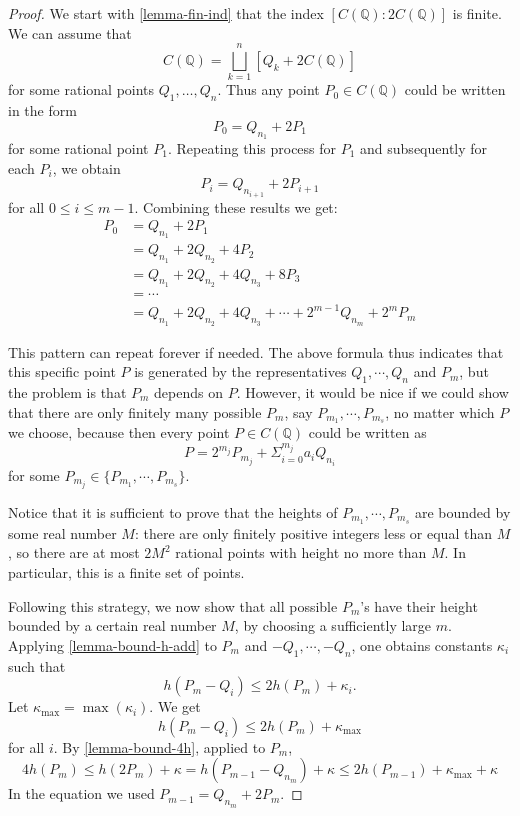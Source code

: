 \documentclass[12pt]{article}
\theoremstyle{remark}
\theoremstyle{definition}
\newcommand{\kp}[0]{\kappa}
\begin{document}
        \begin{proof}
            We start with \autoref{lemma-fin-ind} that the index $[C(\mathbb{Q}):2C(\mathbb{Q})]$ is finite. We can assume that $$C(\mathbb{Q})=\bigsqcup_{k=1}^n\left[Q_k+2C(\mathbb{Q})\right]$$
            for some rational points $Q_1,\dots,Q_n$. Thus any point $P_0\in C(\mathbb{Q})$ could be written in the form
            $$P_0 = Q_{n_1}+2P_1$$
            for some rational point $P_1$.
            Repeating this process for $P_1$ and subsequently for each $P_i$, we obtain
            $$P_i = Q_{n_{i+1}}+2P_{i+1}$$
            for all $0\leqslant i\leqslant m-1$. Combining these results we get:
            \begin{align*}
                P_0 &= Q_{n_1}+2P_1\\
                &= Q_{n_1}+2Q_{n_2}+4P_2\\
                &= Q_{n_1}+2Q_{n_2}+4Q_{n_3}+8P_3\\
                &=\cdots\\
                &= Q_{n_1}+2Q_{n_2}+4Q_{n_3}+\cdots+2^{m-1}Q_{n_m}+2^mP_m
            \end{align*}
    
        This pattern can repeat forever if needed. The above formula thus indicates that this specific point $P$ is generated by the representatives $Q_1,\cdots,Q_n$ and $P_m$, but the problem is that $P_m$ depends on $P$. However, it would be nice if we could show that there are only finitely many possible $P_m$,  say $P_{m_1},\cdots,P_{m_s}$, no matter which $P$ we choose, because then every point $P\in C(\mathbb{Q})$ could be written as
        $$P = 2^{m_j}P_{m_j}+\Sigma_{i=0}^{m_j}a_iQ_{n_i}$$
        for some $P_{m_j}\in \{P_{m_1},\cdots,P_{m_s}\}$.
    
        Notice that it is sufficient to prove that the heights of $P_{m_1},\cdots,P_{m_s}$ are bounded by some real number $M$: there are only finitely positive integers less or equal than $M$, so there are at most $2M^2$ rational points with height no more than $M$. In particular, this is a finite set of points.
    
        Following this strategy, we now show that all possible $P_m$'s have their height bounded by a certain real number $M$, by choosing a sufficiently large $m$. Applying \autoref{lemma-bound-h-add} to $P_m$ and $-Q_1,\cdots,-Q_n$, one obtains constants $\kp_i$ such that
        $$h(P_m-Q_i)\leqslant 2h(P_m) + \kappa_i.$$
        Let $\kappa_{\max}=\max(\kappa_i)$. We get
        $$h(P_m-Q_i)\leqslant 2h(P_m) + \kappa_{\max}$$
        for all $i$. By \autoref{lemma-bound-4h}, applied to $P_m$,
        $$4h(P_m)\leqslant h(2P_m)+\kappa=h(P_{m-1}-Q_{n_m})+\kappa\leqslant 2h(P_{m-1}) + \kappa_{\max}+\kappa$$
        In the equation we used $P_{m-1} = Q_{n_m}+2P_m$.
    

\end{proof}
\end{document}
